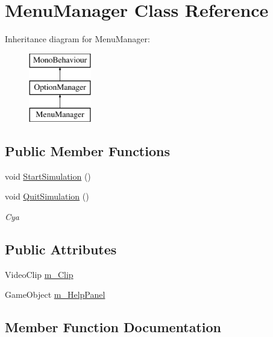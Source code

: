 \hypertarget{class_menu_manager}{}\section{Menu\+Manager Class Reference}
\label{class_menu_manager}
Inheritance diagram for Menu\+Manager\+:\begin{figure}[H]
\begin{center}
\leavevmode
\includegraphics[height=3.000000cm]{class_menu_manager}
\end{center}
\end{figure}
\subsection*{Public Member Functions}
\begin{DoxyCompactItemize}
\item 
void \mbox{\hyperlink{class_menu_manager_aad07ac0fe7c5949783f2e8b27f7d3ad1}{Start\+Simulation}} ()
\item 
void \mbox{\hyperlink{class_menu_manager_a474a447ad86dd14aff2514ddd2e38831}{Quit\+Simulation}} ()
\begin{DoxyCompactList}\small\item\em Cya \end{DoxyCompactList}\end{DoxyCompactItemize}
\subsection*{Public Attributes}
\begin{DoxyCompactItemize}
\item 
Video\+Clip \mbox{\hyperlink{class_menu_manager_a387b1b8533d1014c35f9a5b5f0258654}{m\+\_\+\+Clip}}
\item 
Game\+Object \mbox{\hyperlink{class_menu_manager_a6e4cb070ce6d754b560a44bc03f73c0a}{m\+\_\+\+Help\+Panel}}
\end{DoxyCompactItemize}


\subsection{Member Function Documentation}
\mbox{\label{class_menu_manager_a474a447ad86dd14aff2514ddd2e38831}} 
